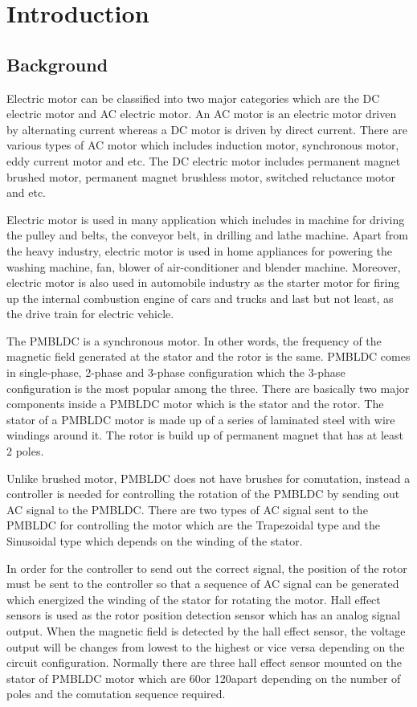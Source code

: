\chapter{Introduction}\label{chap:intro}
\section{Background}

Electric motor can be classified into two major categories which are the DC electric motor and AC electric motor. An AC motor is an electric motor driven by alternating current whereas a DC motor is driven by direct current. There are various types of AC motor which includes induction motor, synchronous motor, eddy current motor and etc. The DC electric motor includes permanent magnet brushed motor, permanent magnet brushless motor, switched reluctance motor and etc.

Electric motor is used in many application which includes in machine for driving the pulley and belts, the conveyor belt, in drilling and lathe machine. Apart from the heavy industry, electric motor is used in home appliances for powering the washing machine, fan, blower of air-conditioner and blender machine. Moreover, electric motor is also used in automobile industry as the starter motor for firing up the internal combustion engine of cars and trucks and last but not least, as the drive train for electric vehicle.

The PMBLDC is a synchronous motor. In other words, the frequency of the magnetic field generated at the stator and the rotor is the same. PMBLDC comes in single-phase, 2-phase and 3-phase configuration which the 3-phase configuration is the most popular among the three. There are basically two major components inside a PMBLDC motor which is the stator and the rotor. The stator of a PMBLDC motor is made up of 
a series of laminated steel with wire windings around it. The rotor is build up of permanent magnet that has at least 2 poles.

Unlike brushed motor, PMBLDC does not have brushes for comutation, instead a controller is needed for controlling the rotation of the PMBLDC by sending out AC signal to the PMBLDC. There are two types of AC signal sent to the PMBLDC for controlling the motor which are the Trapezoidal type and the Sinusoidal type which depends on the winding of the stator.

In order for the controller to send out the correct signal, the position of the rotor must be sent to the controller so that a sequence of AC signal can be generated which energized the winding of the stator for rotating the motor. Hall effect sensors is used as the rotor position detection sensor which has an analog signal output. When the magnetic field is detected by the hall effect sensor, the voltage output will be changes from lowest to the highest or vice versa depending on the circuit configuration. Normally there are three hall effect sensor mounted on the stator of PMBLDC motor which are 60\textdegree or 120\textdegree apart depending on the number of poles and the comutation sequence required.

